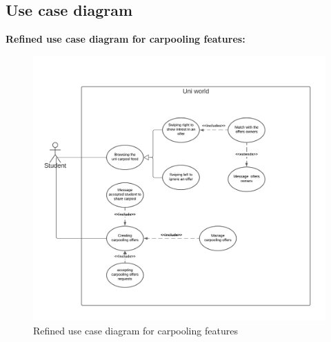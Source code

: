\subsection{Use case diagram}
\textbf{Refined use case diagram for carpooling features: }
\begin{figure}[H] 
            \centering
            \includegraphics[scale=0.6]{diagrams/refined use case carpool swipe.png}
            \caption{Refined use case diagram for carpooling features} 
            \label{fig: Refined use case diagram for carpooling features}
\end{figure}

